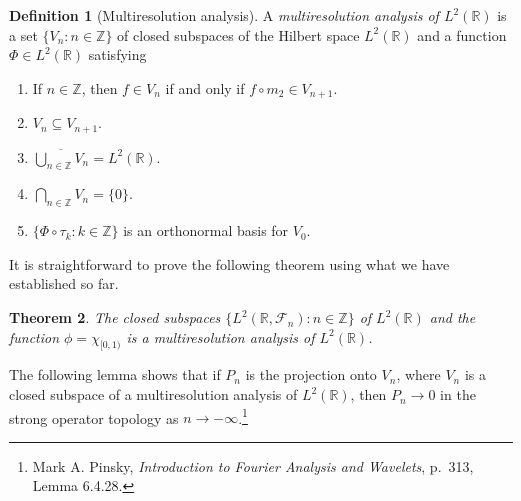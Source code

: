 \documentclass{article}
\newtheorem{theorem}{Theorem}
\theoremstyle{definition}
\newtheorem{definition}[theorem]{Definition}
\begin{document}
\begin{definition}[Multiresolution analysis]
A {\em multiresolution analysis of $L^2(\mathbb{R})$} is a set $\{V_n:n \in \mathbb{Z}\}$ of
closed subspaces of the Hilbert space $L^2(\mathbb{R})$ and a function $\Phi \in L^2(\mathbb{R})$ satisfying
\begin{enumerate}
\item If $n \in \mathbb{Z}$, then $f \in V_n$ if and only if $f \circ m_2 \in V_{n+1}$.
\item $V_n \subseteq V_{n+1}$.
\item $\overline{\bigcup_{n \in \mathbb{Z}} V_n}=  L^2(\mathbb{R})$.
\item $\bigcap_{n \in \mathbb{Z}} V_n=\{0\}$.
\item $\{\Phi \circ \tau_k : k \in \mathbb{Z}\}$ is an orthonormal basis for $V_0$.
\end{enumerate}
\label{MRAdef}
\end{definition}

It is straightforward to prove the following theorem using what we have established so far.


\begin{theorem}
The closed subspaces $\{L^2(\mathbb{R},\mathscr{F}_n):n \in \mathbb{Z}\}$ of $L^2(\mathbb{R})$ and the function $\phi=\chi_{[0,1)}$ is a multiresolution analysis
of $L^2(\mathbb{R})$.
\end{theorem}



The following lemma shows that if $P_n$ is the projection onto $V_n$, where $V_n$ is a closed subspace of a multiresolution analysis of $L^2(\mathbb{R})$, then
$P_n \to 0$ in the strong operator topology as $n \to -\infty$.\footnote{Mark A. Pinsky, 
 {\em Introduction to Fourier Analysis and Wavelets}, p.~313, Lemma 6.4.28.}
\end{document}
